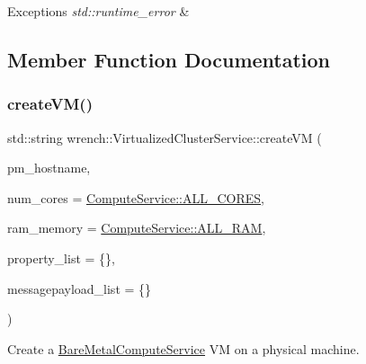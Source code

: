 \begin{DoxyExceptions}{Exceptions}
{\em std\+::runtime\+\_\+error} & \\
\hline
\end{DoxyExceptions}


\subsection{Member Function Documentation}
\mbox{\label{classwrench_1_1_virtualized_cluster_service_afb90d549ca85f41946b155cff49e37ce}} 
\subsubsection{\texorpdfstring{create\+V\+M()}{createVM()}}
{\footnotesize\ttfamily std\+::string wrench\+::\+Virtualized\+Cluster\+Service\+::create\+VM (\begin{DoxyParamCaption}\item[{const std\+::string \&}]{pm\+\_\+hostname,  }\item[{unsigned long}]{num\+\_\+cores = {\ttfamily \hyperlink{classwrench_1_1_compute_service_a1160f521623440ad4e0e0823e08a7d22}{Compute\+Service\+::\+A\+L\+L\+\_\+\+C\+O\+R\+ES}},  }\item[{double}]{ram\+\_\+memory = {\ttfamily \hyperlink{classwrench_1_1_compute_service_abc4fe0bad59f544b4b34d0e7d4012d44}{Compute\+Service\+::\+A\+L\+L\+\_\+\+R\+AM}},  }\item[{std\+::map$<$ std\+::string, std\+::string $>$}]{property\+\_\+list = {\ttfamily \{\}},  }\item[{std\+::map$<$ std\+::string, std\+::string $>$}]{messagepayload\+\_\+list = {\ttfamily \{\}} }\end{DoxyParamCaption})\hspace{0.3cm}{\ttfamily [virtual]}}



Create a \hyperlink{classwrench_1_1_bare_metal_compute_service}{Bare\+Metal\+Compute\+Service} VM on a physical machine. 


